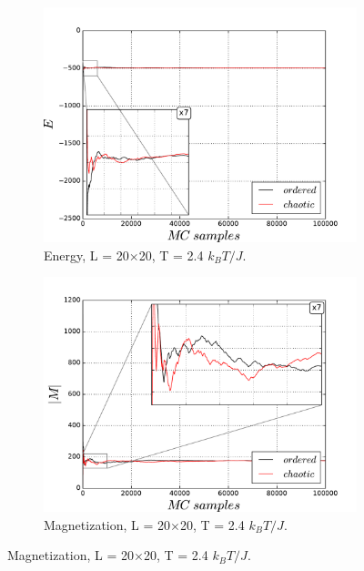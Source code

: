 \documentclass[10pt]{article}
\begin{document}
\clearpage
%





\newpage
\begin{figure}
\centering
   \begin{subfigure}[b]{1\textwidth}
   \includegraphics[width=0.9\linewidth]{20x20_10_5_24_energy}
   \caption{Energy, L = 20$\times$20, T = 2.4 $k_BT/J$.}
   \label{fig:energy_24k} 
\end{subfigure}

\begin{subfigure}[b]{1\textwidth}
   \includegraphics[width=0.9\linewidth]{20x20_10_5_24_magnet}
   \caption{Magnetization, L = 20$\times$20, T = 2.4 $k_BT/J$.}
   \label{fig:magnetization_24k}
\end{subfigure}


\end{figure}
\end{document}
